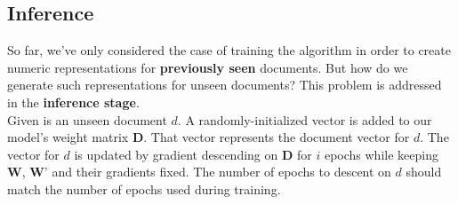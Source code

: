 \documentclass[english]{lni}
\begin{document}
\subsection{Inference}
So far, we've only considered the case of training the algorithm in order to create numeric representations for \textbf{previously seen} documents.
But how do we generate such representations for unseen documents? This problem is addressed in the \textbf{inference stage}.\\
Given is an unseen document $d$. A randomly-initialized vector is added to our model's weight matrix $\textbf{D}$.
That vector represents the document vector for $d$. 
The vector for $d$ is updated by gradient descending on $\textbf{D}$ for $i$ epochs while keeping $\textbf{W}$, $\textbf{W'}$ and their gradients fixed.
The number of epochs to descent on $d$ should match the number of epochs used during training. 

\end{document}

